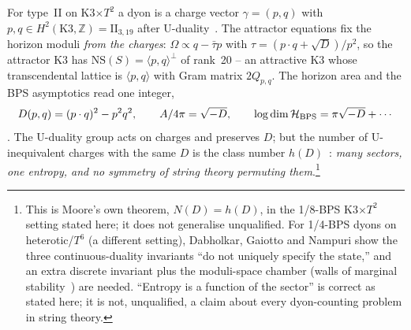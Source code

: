 \documentclass[11pt,a4paper]{article}
\begin{document}
For type~II on K3$\times T^2$ a dyon is a charge vector $\gamma=(p,q)$ with $p,q\in H^2(\mathrm{K3},\mathbb
Z)=\mathrm{II}_{3,19}$ after U-duality~\cite{Moore1998,FerraraKalloshStrominger1995}. The attractor equations fix
the horizon moduli \emph{from the charges}: $\Omega\propto q-\bar\tau p$ with $\tau=(p\cdot q+\sqrt{D})/p^2$, so
the attractor K3 has $\mathrm{NS}(S)=\langle p,q\rangle^\perp$ of rank~20 -- an attractive K3 whose
transcendental lattice is $\langle p,q\rangle$ with Gram matrix $2Q_{p,q}$. The horizon area and the BPS
asymptotics read one integer,
\[
D(p,q)=(p\cdot q)^2-p^2q^2,\qquad A/4\pi=\sqrt{-D},\qquad \log\dim\mathcal H_{\rm BPS}=\pi\sqrt{-D}+\cdots
\]
\cite{DVV1997}. The U-duality group acts on charges and preserves $D$; but the number of U-inequivalent charges
with the same $D$ is the class number $h(D)$~\cite{Moore1998}: \emph{many sectors, one entropy, and no symmetry of
string theory permuting them}.\footnote{This is Moore's own theorem, $N(D)=h(D)$, in the 1/8-BPS K3$\times T^2$
setting stated here; it does not generalise unqualified. For 1/4-BPS dyons on heterotic/$T^6$ (a different
setting), Dabholkar, Gaiotto and Nampuri show the three continuous-duality invariants ``do not uniquely specify
the state,'' and an extra discrete invariant plus the moduli-space chamber (walls of marginal
stability~\cite{Sen2007dyon}) are needed. ``Entropy is a function of the sector'' is correct as stated here; it
is not, unqualified, a claim about every dyon-counting problem in string theory.}
\end{document}
